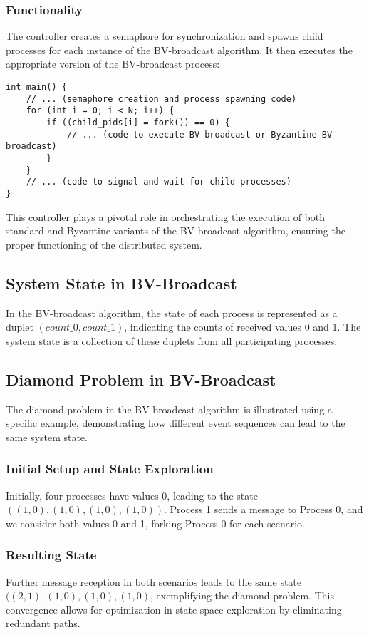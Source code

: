 \documentclass[a4paper,11pt,oneside]{report}
\begin{document}
\subsubsection{Functionality}
The controller creates a semaphore for synchronization and spawns child processes for each instance of the BV-broadcast algorithm. It then executes the appropriate version of the BV-broadcast process:

\begin{verbatim}
int main() {
    // ... (semaphore creation and process spawning code)
    for (int i = 0; i < N; i++) {
        if ((child_pids[i] = fork()) == 0) {
            // ... (code to execute BV-broadcast or Byzantine BV-broadcast)
        }
    }
    // ... (code to signal and wait for child processes)
}
\end{verbatim}

This controller plays a pivotal role in orchestrating the execution of both standard and Byzantine variants of the BV-broadcast algorithm, ensuring the proper functioning of the distributed system.

\subsection{System State in BV-Broadcast}
In the BV-broadcast algorithm, the state of each process is represented as a duplet \((count\_0, count\_1)\), indicating the counts of received values 0 and 1. The system state is a collection of these duplets from all participating processes.

\subsection{Diamond Problem in BV-Broadcast}
The diamond problem in the BV-broadcast algorithm is illustrated using a specific example, demonstrating how different event sequences can lead to the same system state.

\subsubsection{Initial Setup and State Exploration}
Initially, four processes have values 0, leading to the state \(((1,0), (1,0), (1,0), (1,0))\). Process 1 sends a message to Process 0, and we consider both values 0 and 1, forking Process 0 for each scenario.

\subsubsection{Resulting State}
Further message reception in both scenarios leads to the same state \(((2,1), (1,0), (1,0), (1,0)\), exemplifying the diamond problem. This convergence allows for optimization in state space exploration by eliminating redundant paths.
\end{document}
